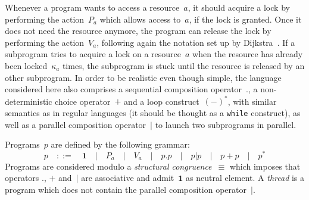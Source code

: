 \documentclass[orivec]{llncs} \usepackage[T1]{fontenc}
\newcommand{\gramor}{\quad|\quad}
\newcommand{\pone}{\mathbf{1}}
\renewcommand{\P}[1]{P_{#1}}
\newcommand{\V}[1]{V_{#1}}
\newcommand{\capacity}[1]{\kappa_{#1}}
\begin{document}
Whenever a program wants to access a resource~$a$, it should acquire a lock by
performing the action~$\P{a}$ which allows access to~$a$, if the lock is
granted. Once it does not need the resource anymore, the program can release the
lock by performing the action~$\V{a}$, following again the notation set up by
Dijkstra~\cite{DijkstraPV}. If a subprogram tries to acquire a lock on a
resource~$a$ when the resource has already been locked~$\capacity{a}$ times, the
subprogram is stuck until the resource is released by an other subprogram. In
order to be realistic even though simple, the language considered here also
comprises a sequential composition operator~$.$, a non-deterministic choice
operator~$+$ and a loop construct~$(-)^*$, with similar semantics as in regular
languages (it should be thought as a \texttt{while} construct), as well as a
parallel composition operator~$|$ to launch two subprograms in parallel.

Programs~$p$ are defined by the following grammar:
\[
p
\quad::=\quad
\pone
\gramor
\P{a}
\gramor
\V{a}
\gramor
p.p
\gramor
p|p
\gramor
p+p
\gramor
p^*
\]
Programs are considered modulo a \emph{structural congruence}~$\equiv$ which
imposes that operators $.$, $+$ and~$|$ are associative and admit~$\pone$ as
neutral element.
A \emph{thread} is a program which does not contain the parallel composition
operator~$|$.
\end{document}
